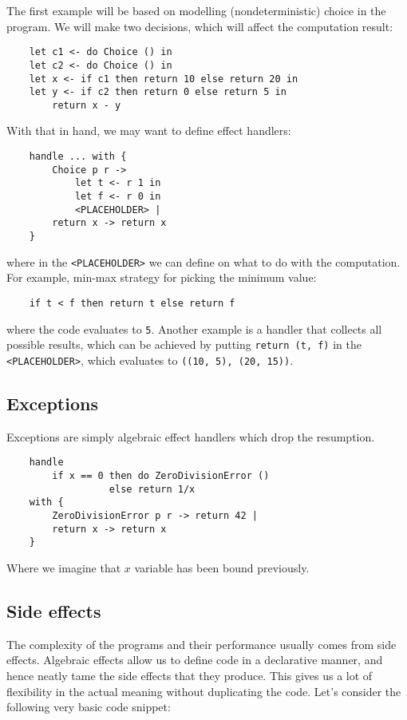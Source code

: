 \documentclass[declaration,shortabstract]{iithesis}
\begin{document}
    The first example will be based on modelling (nondeterministic) choice
    in the program. We will make two decisions, which will affect the computation
    result:

    \begin{verbatim}
    let c1 <- do Choice () in
    let c2 <- do Choice () in
    let x <- if c1 then return 10 else return 20 in
    let y <- if c2 then return 0 else return 5 in
        return x - y
    \end{verbatim}
    With that in hand, we may want to define effect handlers:

    \begin{verbatim}
    handle ... with {
        Choice p r ->
            let t <- r 1 in
            let f <- r 0 in
            <PLACEHOLDER> |
        return x -> return x
    }
    \end{verbatim}
    where in the \verb!<PLACEHOLDER>! we can define on what to do with the
    computation. For example, min-max strategy for picking the minimum value:

    \begin{verbatim}
    if t < f then return t else return f
    \end{verbatim}
    where the code evaluates to \verb!5!. Another example is a handler that
    collects all possible results, which can be achieved by putting
    \verb!return (t, f)! in the \verb!<PLACEHOLDER>!, which evaluates to \verb!((10, 5), (20, 15))!.

    \subsection{Exceptions}

    Exceptions are simply algebraic effect handlers which drop the resumption.

    \begin{verbatim}
    handle
        if x == 0 then do ZeroDivisionError ()
                  else return 1/x
    with {
        ZeroDivisionError p r -> return 42 |
        return x -> return x
    }
    \end{verbatim}
    Where we imagine that $x$ variable has been bound previously.

    \subsection{Side effects}

    The complexity of the programs and their performance usually comes from side effects.
    Algebraic effects allow us to define code in a declarative manner, and hence
    neatly tame the side effects that they produce. This gives us a lot of flexibility
    in the actual meaning without duplicating the code. Let's consider the following
    very basic code snippet:
\end{document}
